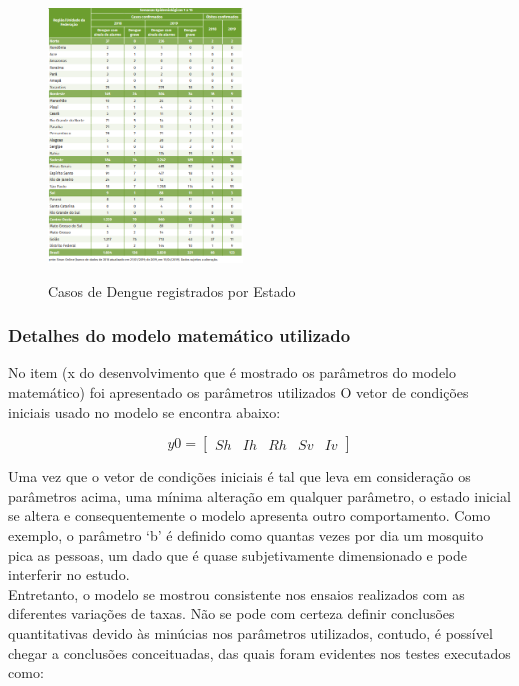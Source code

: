 \documentclass[conference]{IEEEtran}
\begin{document}
\begin{figure}[!ht]
  \caption{Casos de Dengue registrados por Estado\cite{svs}}
  \includegraphics[width=0.46\textwidth]{casos.png}
  \label{fig:casos}
\end{figure}

\subsubsection{Detalhes do modelo matemático utilizado}
No item (x do desenvolvimento que é mostrado os parâmetros do modelo matemático) foi apresentado os parâmetros utilizados
O vetor de condições iniciais usado no modelo se encontra abaixo:

 $$
  y0 = \left[
\begin{array}{rrrrr}
 Sh & Ih & Rh & Sv & Iv
\end{array}\right]
$$

Uma vez que o vetor de condições iniciais é tal que leva em consideração os parâmetros acima, uma mínima alteração em qualquer parâmetro, o estado inicial se altera e consequentemente o modelo apresenta outro comportamento. Como exemplo, o parâmetro ‘b’ é definido como quantas vezes por dia um mosquito pica as pessoas, um dado que é quase subjetivamente dimensionado e pode interferir no estudo.\\

Entretanto, o modelo se mostrou consistente nos ensaios realizados com as diferentes variações de taxas. Não se pode com certeza definir conclusões quantitativas devido às minúcias nos parâmetros utilizados, contudo, é possível chegar a conclusões conceituadas, das quais foram evidentes nos testes executados como:\\
\end{document}
